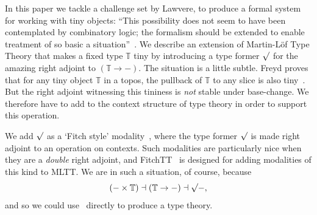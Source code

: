\documentclass[10pt]{article}
\theoremstyle{definition}
\newcommand{\Tiny}{\mathbb{T}}
\newcommand{\rformsym}{\surd}
\newcommand{\rformu}[1]{\ThisStyle{\raisebox{0.07em}{$\SavedStyle \rformsym$}} #1}
\newcommand{\PSh}{\mathsf{PSh}}
\newcommand{\yo}{\mathsf{y}}
\newcommand{\Set}{\mathsf{Set}}
\newcommand{\C}{\mathcal{C}}
\begin{document}

In this paper we tackle a challenge set by Lawvere, to produce a
formal system for working with tiny objects: ``This possibility does
not seem to have been contemplated by combinatory logic; the formalism
should be extended to enable treatment of so basic a
situation''~\cite[Section 3]{lawvere:adjoints}. We describe an
extension of Martin-Löf Type Theory that makes a fixed type $\Tiny$
tiny by introducing a type former $\rformu$ for the amazing right
adjoint to $(\Tiny \to -)$. The situation is a little subtle. Freyd
proves that for any tiny object $\Tiny$ in a topos, the pullback of
$\Tiny$ to any slice is also tiny~\cite[Theorem 1.4]{yetter:tiny}. But
the right adjoint witnessing this tininess is \emph{not} stable under
base-change. We therefore have to add to the context structure of type
theory in order to support this operation.

We add $\rformu$ as a `Fitch style'
modality~\cite{clouston:fitch-style, drats}, where the type former
$\rformu$ is made right adjoint to an operation on contexts. Such
modalities are particularly nice when they are a \emph{double}
right adjoint, and \textsf{FitchTT}~\cite{fitchtt} is designed for adding
modalities of this kind to MLTT\@. We are in such a situation, of
course, because
\[{(- \times \Tiny) \dashv (\Tiny \to -) \dashv \rformu -},\] and so
we could use~\cite{fitchtt} directly to produce a type theory.
\end{document}
